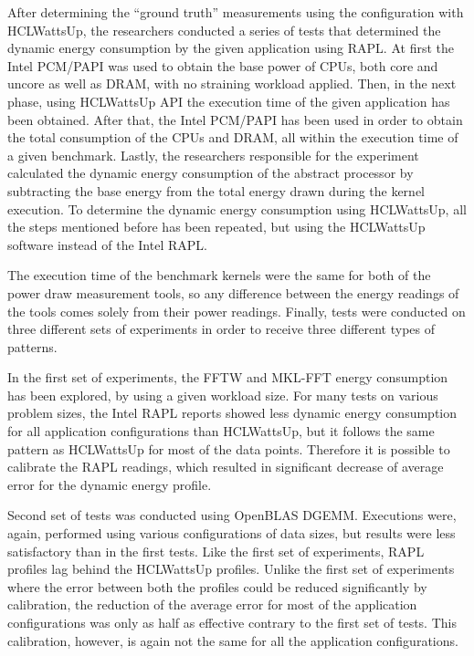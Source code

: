 After determining the “ground truth” measurements using the
configuration with HCLWattsUp, the researchers conducted a series
of tests that determined the dynamic energy consumption by the
given application using RAPL\@. At first the Intel PCM/PAPI was
used to obtain the base power of CPUs, both core and uncore as
well as DRAM, with no straining workload applied. Then, in the
next phase, using HCLWattsUp API the execution time of the given
application has been obtained. After that, the Intel PCM/PAPI has
been used in order to obtain the total consumption of the CPUs and
DRAM, all within the execution time of a given benchmark. Lastly,
the researchers responsible for the experiment calculated the
dynamic energy consumption of the abstract processor by subtracting
the base energy from the total energy drawn during the kernel
execution. To determine the dynamic energy consumption using
HCLWattsUp, all the steps mentioned before has been repeated,
but using the HCLWattsUp software instead of the Intel RAPL\@.

The execution time of the benchmark kernels were the same for
both of the power draw measurement tools, so any difference
between the energy readings of the tools comes solely from
their power readings. Finally, tests were conducted on three
different sets of experiments in order to receive three different
types of patterns.

In the first set of experiments, the FFTW and MKL-FFT energy
consumption has been explored, by using a given workload size.
For many tests on various problem sizes, the Intel RAPL reports
showed less dynamic energy consumption for all application
configurations than HCLWattsUp, but it follows the same pattern
as HCLWattsUp for most of the data points. Therefore it is
possible to calibrate the RAPL readings, which resulted in
significant decrease of average error for the dynamic energy
profile.

Second set of tests was conducted using OpenBLAS DGEMM\@.
Executions were, again, performed using various configurations
of data sizes, but results were less satisfactory than in the
first tests. Like the first set of experiments, RAPL profiles
lag behind the HCLWattsUp profiles. Unlike the first set of
experiments where the error between both the profiles could be
reduced significantly by calibration, the reduction of the average
error for most of the application configurations was only as
half as effective contrary to the first set of tests. This
calibration, however, is again not the same for all the application
configurations.


